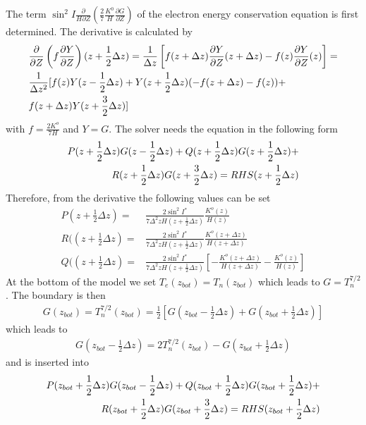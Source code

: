 The term $\sin^2 I \frac{\partial}{H \partial Z}\left( \frac{2}{7}\frac{K^0}{H}
\frac{\partial G}{ \partial Z}\right)$ of the electron energy conservation
equation is first determined. The derivative is calculated by
%
\begin{align}
 {} &  \frac{\partial}{\partial Z} \left( f \frac{\partial Y}{\partial Z} \right) (z+\frac{1}{2} \Delta z)=
   \frac{1}{\Delta z} \left[ f(z+\Delta z) \frac{\partial Y}{\partial Z}(z+\Delta z) -
  f(z) \frac{\partial Y}{\partial Z}(z) \right] =   \notag \\
 {} &  \frac{1}{\Delta z^2} [ f(z)Y(z-\frac{1}{2}\Delta z) + Y(z+\frac{1}{2}\Delta z)
  (-f(z+\Delta z)- f(z)) +  \\
  {} & f(z+\Delta z) Y(z+\frac{3}{2}\Delta z)] \notag
\end{align}
%
with $f= \frac{2 K^o}{7 H}$ and $Y = G$. The solver needs the equation in the following form
%
\begin{align}
  P(z+\frac{1}{2} \Delta z) G(z-\frac{1}{2} \Delta z) + Q(z+\frac{1}{2} \Delta z)
  G(z+\frac{1}{2} \Delta z) + \notag \\
  R(z+\frac{1}{2} \Delta z) G(z+\frac{3}{2} \Delta z) = RHS(z+\frac{1}{2} \Delta z)
\end{align}
%
Therefore, from the derivative the following values can be set
%
\begin{align}
   P(z+\frac{1}{2} \Delta z) = & \frac{2 \sin^2 I^*}{7 \Delta^2 z H(z+\frac{1}{2} \Delta z)}
   \frac{K^o(z)}{H(z)} \\
   R((z+\frac{1}{2} \Delta z) = & \frac{2 \sin^2 I^*}{7 \Delta^2 z H(z+\frac{1}{2} \Delta z)}
   \frac{K^o(z+\Delta z)}{H(z+ \Delta z)} \\
   Q((z+\frac{1}{2} \Delta z) = & \frac{2 \sin^2 I^*}{7 \Delta^2 z H(z+\frac{1}{2} \Delta z)}
   \left[ - \frac{K^o(z+\Delta z)}{H(z+ \Delta z)} - \frac{K^o(z)}{H(z)}\right]
\end{align}
%
At the bottom of the model we set $T_e(z_{bot}) = T_n(z_{bot}) $ which leads to
$G= T_n^{7/2}$. The boundary is then
%
\begin{align}
  G(z_{bot}) = T_n^{7/2}(z_{bot})= \frac{1}{2} [G(z_{bot}-\frac{1}{2}\Delta z) +
   G(z_{bot}+\frac{1}{2}\Delta z)]
\end{align}
%
which leads to
%
\begin{align}
  G(z_{bot}-\frac{1}{2}\Delta z) = 2 T_n^{7/2}(z_{bot}) - G(z_{bot}+\frac{1}{2}\Delta z)
\end{align}
%
and is inserted into
%
\begin{align}
  P(z_{bot}+\frac{1}{2} \Delta z) G(z_{bot}-\frac{1}{2} \Delta z) + Q(z_{bot}+\frac{1}{2} \Delta z)
  G(z_{bot}+\frac{1}{2} \Delta z) + \notag \\
  R(z_{bot}+\frac{1}{2} \Delta z) G(z_{bot}+\frac{3}{2} \Delta z) =
  RHS(z_{bot}+\frac{1}{2} \Delta z)
\end{align}
